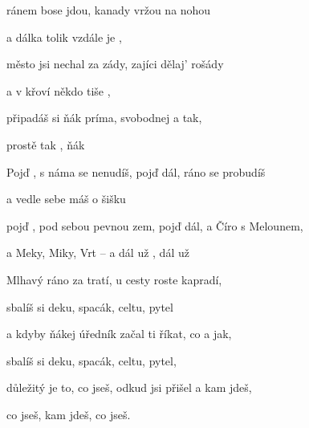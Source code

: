 

\zs
{} ránem bose jdou, kanady vržou na nohou

a dálka tolik vzdále je ,

město jsi nechal za zády, zajíci dělaj' rošády

a v křoví někdo tiše  ,

 připadáš si ňák príma, svobodnej a tak,

prostě  tak , ňák 
\ks

\zr
Pojď , s náma se nenudíš, pojď dál, ráno se probudíš

a vedle sebe máš o šišku 

pojď , pod sebou pevnou zem, pojď dál, a Číro s Melounem,

a Meky, Miky, Vrt -- a dál už , dál už 
\kr

\zs
Mlhavý ráno za tratí, u cesty roste kapradí,

sbalíš si deku, spacák, celtu, pytel

a kdyby ňákej úředník začal ti říkat, co a jak,

sbalíš si deku, spacák, celtu, pytel,

důležitý je to, co jseš, odkud jsi přišel a kam jdeš,

co jseš, kam jdeš, co jseš.
\ks

\zr  \kr

\kp


